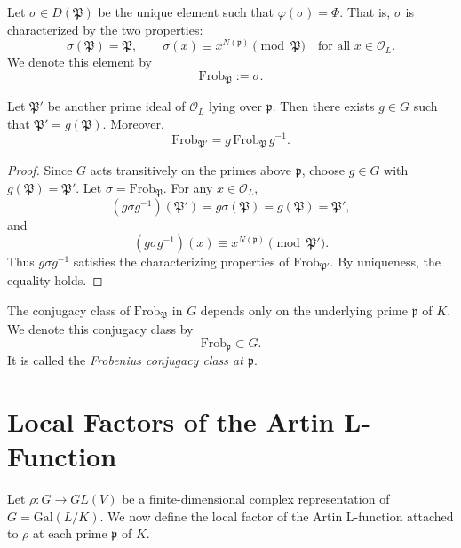 \begin{defn}
Let \(\sigma \in D(\mathfrak{P})\) be the unique element such that \(\varphi(\sigma) = \Phi\). That is, \(\sigma\) is characterized by the two properties:
\[
\sigma(\mathfrak{P}) = \mathfrak{P}, \qquad
\sigma(x) \equiv x^{N(\mathfrak{p})} \pmod{\mathfrak{P}} \quad \text{for all } x \in \mathcal{O}_L.
\]
We denote this element by
\[
\mathrm{Frob}_{\mathfrak{P}} := \sigma.
\]
\end{defn}

\begin{prop}
Let \(\mathfrak{P}'\) be another prime ideal of \(\mathcal{O}_L\) lying over \(\mathfrak{p}\). Then there exists \(g \in G\) such that \(\mathfrak{P}' = g(\mathfrak{P})\). Moreover,
\[
\mathrm{Frob}_{\mathfrak{P}'} = g \,\mathrm{Frob}_{\mathfrak{P}}\, g^{-1}.
\]
\end{prop}

\begin{proof}
Since \(G\) acts transitively on the primes above \(\mathfrak{p}\), choose \(g \in G\) with \(g(\mathfrak{P}) = \mathfrak{P}'\). Let \(\sigma = \mathrm{Frob}_{\mathfrak{P}}\). For any \(x \in \mathcal{O}_L\),
\[
(g\sigma g^{-1})(\mathfrak{P}') = g\sigma(\mathfrak{P}) = g(\mathfrak{P}) = \mathfrak{P}',
\]
and
\[
(g\sigma g^{-1})(x) \equiv x^{N(\mathfrak{p})} \pmod{\mathfrak{P}'}.
\]
Thus \(g\sigma g^{-1}\) satisfies the characterizing properties of \(\mathrm{Frob}_{\mathfrak{P}'}\). By uniqueness, the equality holds.
\end{proof}

\begin{defn}
The conjugacy class of \(\mathrm{Frob}_{\mathfrak{P}}\) in \(G\) depends only on the underlying prime \(\mathfrak{p}\) of \(K\). We denote this conjugacy class by
\[
\mathrm{Frob}_{\mathfrak{p}} \subset G.
\]
It is called the \emph{Frobenius conjugacy class at \(\mathfrak{p}\)}.
\end{defn}

\section{Local Factors of the Artin L-Function}

Let \(\rho: G \to GL(V)\) be a finite-dimensional complex representation of \(G = \mathrm{Gal}(L/K)\). We now define the local factor of the Artin L-function attached to \(\rho\) at each prime \(\mathfrak{p}\) of \(K\).


